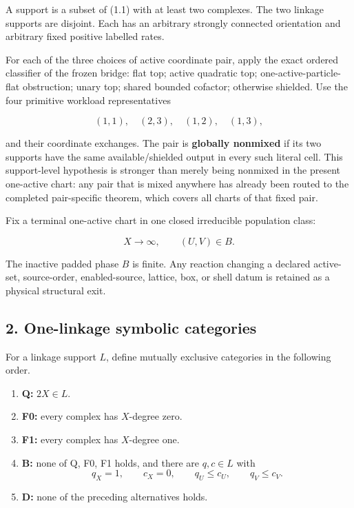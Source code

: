 A support is a subset of (1.1) with at least two complexes. The two
linkage supports are disjoint. Each has an arbitrary strongly connected
orientation and arbitrary fixed positive labelled rates.

For each of the three choices of active coordinate pair, apply the exact
ordered classifier of the frozen bridge: flat top; active quadratic top;
one-active-particle-flat obstruction; unary top; shared bounded
cofactor; otherwise shielded. Use the four primitive workload
representatives

\[
             (1,1),\quad(2,3),\quad(1,2),\quad(1,3), \tag{1.2}
\]

and their coordinate exchanges. The pair is \textbf{globally nonmixed}
if its two supports have the same available/shielded output in every
such literal cell. This support-level hypothesis is stronger than merely
being nonmixed in the present one-active chart: any pair that is mixed
anywhere has already been routed to the completed pair-specific theorem,
which covers all charts of that fixed pair.

Fix a terminal one-active chart in one closed irreducible population
class:

\[
                  X\longrightarrow\infty,\qquad (U,V)\in B. \tag{1.3}
\]

The inactive padded phase \(B\) is finite. Any reaction changing a
declared active-set, source-order, enabled-source, lattice, box, or
shell datum is retained as a physical structural exit.

\subsection{2. One-linkage symbolic
categories}

For a linkage support \(L\), define mutually exclusive categories in the
following order.

\begin{enumerate}
\def\labelenumi{\arabic{enumi}.}
\tightlist
\item
  \textbf{Q:} \(2X\in L\).
\item
  \textbf{F0:} every complex has \(X\)-degree zero.
\item
  \textbf{F1:} every complex has \(X\)-degree one.
\item
  \textbf{B:} none of Q, F0, F1 holds, and there are \(q,c\in L\) with
  \[
    q_X=1,\qquad c_X=0,\qquad q_U\le c_U,\qquad q_V\le c_V. \tag{2.1}
  \]
\item
  \textbf{D:} none of the preceding alternatives holds.
\end{enumerate}

